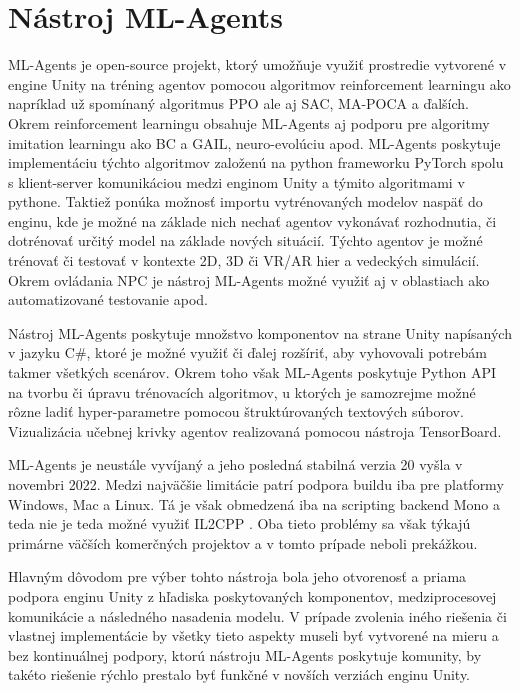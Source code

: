 \documentclass[slovak, master]{diploma}
\begin{document}
\section{Nástroj ML-Agents}
\label{sec:ML-Agents}
ML-Agents \cite{mlagents} je open-source projekt, ktorý umožňuje využiť prostredie vytvorené v engine Unity na tréning agentov pomocou algoritmov reinforcement learningu ako napríklad už spomínaný algoritmus PPO ale aj SAC, MA-POCA a ďalších. Okrem reinforcement learningu obsahuje ML-Agents aj podporu pre algoritmy imitation learningu ako BC a GAIL, neuro-evolúciu apod. ML-Agents poskytuje implementáciu týchto algoritmov založenú na python frameworku PyTorch spolu s klient-server komunikáciou medzi enginom Unity a týmito algoritmami v pythone. Taktiež ponúka možnosť importu vytrénovaných modelov naspäť do enginu, kde je možné na základe nich nechať agentov vykonávať rozhodnutia, či dotrénovať určitý model na základe nových situácií. Týchto agentov je možné trénovať či testovať v kontexte 2D, 3D či VR/AR hier a vedeckých simulácií. Okrem ovládania NPC je nástroj ML-Agents možné využiť aj v oblastiach ako automatizované testovanie apod.

Nástroj ML-Agents poskytuje množstvo komponentov na strane Unity napísaných v jazyku C\#, ktoré je možné využiť či ďalej rozšíriť, aby vyhovovali potrebám takmer všetkých scenárov. Okrem toho však ML-Agents poskytuje Python API na tvorbu či úpravu trénovacích algoritmov, u ktorých je samozrejme možné rôzne ladiť hyper-parametre pomocou štruktúrovaných textových súborov. Vizualizácia učebnej krivky agentov realizovaná pomocou nástroja TensorBoard.

ML-Agents je neustále vyvíjaný a jeho posledná stabilná verzia 20 vyšla v novembri 2022. Medzi najväčšie limitácie patrí podpora buildu iba pre platformy Windows, Mac a Linux. Tá je však obmedzená iba na scripting backend Mono a teda nie je teda možné využiť IL2CPP \cite{mlagentsGit}. Oba tieto problémy sa však týkajú primárne väčších komerčných projektov a v tomto prípade neboli prekážkou. 

Hlavným dôvodom pre výber tohto nástroja bola jeho otvorenosť a priama podpora enginu Unity z hľadiska poskytovaných komponentov, medziprocesovej komunikácie a následného nasadenia modelu. V prípade zvolenia iného riešenia či vlastnej implementácie by všetky tieto aspekty museli byť vytvorené na mieru a bez kontinuálnej podpory, ktorú nástroju ML-Agents poskytuje komunity, by takéto riešenie rýchlo prestalo byť funkčné v novších verziách enginu Unity.
\end{document}
